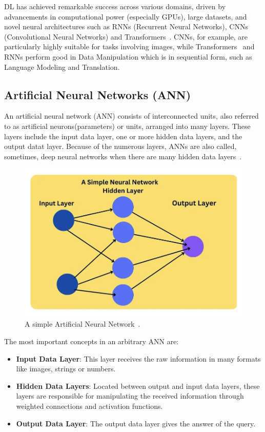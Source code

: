 \documentclass[12pt,a4paper]{report}
\begin{document}
DL has achieved remarkable success across various domains, driven by advancements in computational power (especially GPUs), large datasets, and novel neural architectures such as RNNs (Recurrent Neural Networks), CNNs (Convolutional Neural Networks) and Transformers~\cite{vaswani2017attention}. CNNs, for example, are particularly highly suitable for tasks involving images, while Transformers~\cite{vaswani2017attention} and RNNs perform good in Data Manipulation which is in sequential form, such as Language Modeling and Translation.
\subsection{Artificial Neural Networks (ANN)}
An artificial neural network (ANN) consists of interconnected units, also referred to as artificial neurons(parameters) or units, arranged into many layers. These layers include the input data layer, one or more hidden data layers, and the output datat layer. Because of the numerous layers, ANNs are also called, sometimes, deep neural networks when there are many hidden data layers~\cite{ann}.

\begin{figure}[th]
  \centering
  \includegraphics[scale=0.52]{./pics/ann.png}
  \caption[A simple Artificial Neural Network]{A simple Artificial Neural Network~\cite{ann}.}
  \label{fig:pi4}
\end{figure}

The most important concepts in an arbitrary ANN are:

\begin{itemize}
  \item \textbf{Input Data Layer}: This layer receives the raw information in many formats like images, strings or numbers.
  \item \textbf{Hidden Data Layers}: Located between output and input data layers, these layers are responsible for manipulating the received information through weighted connections and activation functions.
  \item \textbf{Output Data Layer}: The output data layer gives the answer of the query.
\end{itemize}
\end{document}
